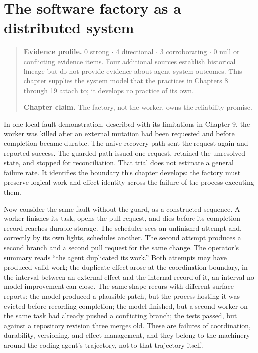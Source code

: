 \chapter{The software factory as a distributed system}
\label{ch07-software-factory-distributed-system}
\begin{quote}
\textbf{Evidence profile.} 0 strong \(\cdot\) 4 directional \(\cdot\) 3 corroborating \(\cdot\) 0 null or conflicting evidence items. Four additional sources establish historical lineage but do not provide evidence about agent-system outcomes. This chapter supplies the system model that the practices in Chapters 8 through 19 attach to; it develops no practice of its own.

\textbf{Chapter claim.} The factory, not the worker, owns the reliability promise.
\end{quote}

In one local fault demonstration, described with its limitations in Chapter 9, the worker was killed after an external mutation had been requested and before completion became durable. The naive recovery path sent the request again and reported success. The guarded path issued one request, retained the unresolved state, and stopped for reconciliation. That trial does not estimate a general failure rate. It identifies the boundary this chapter develops: the factory must preserve logical work and effect identity across the failure of the process executing them.

Now consider the same fault without the guard, as a constructed sequence. A worker finishes its task, opens the pull request, and dies before its completion record reaches durable storage. The scheduler sees an unfinished attempt and, correctly by its own lights, schedules another. The second attempt produces a second branch and a second pull request for the same change. The operator's summary reads ``the agent duplicated its work.'' Both attempts may have produced valid work; the duplicate effect arose at the coordination boundary, in the interval between an external effect and the internal record of it, an interval no model improvement can close. The same shape recurs with different surface reports: the model produced a plausible patch, but the process hosting it was evicted before recording completion; the model finished, but a second worker on the same task had already pushed a conflicting branch; the tests passed, but against a repository revision three merges old. These are failures of coordination, durability, versioning, and effect management, and they belong to the machinery around the coding agent's trajectory, not to that trajectory itself.

